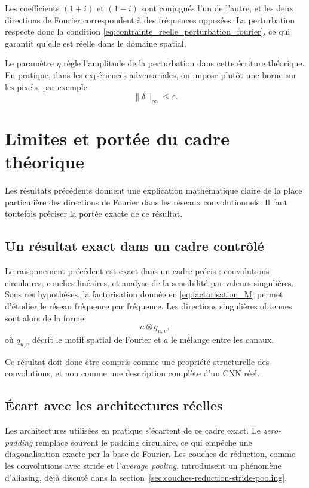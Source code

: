 Les coefficients $(1+i)$ et $(1-i)$ sont conjugués l'un de l'autre, et les deux directions de Fourier
correspondent à des fréquences opposées. La perturbation respecte donc la condition
\eqref{eq:contrainte_reelle_perturbation_fourier}, ce qui garantit qu'elle est réelle dans le domaine spatial.

Le paramètre $\eta$ règle l'amplitude de la perturbation dans cette écriture théorique. En pratique,
dans les expériences adversariales, on impose plutôt une borne sur les pixels, par exemple
\[
    \|\delta\|_\infty \leq \varepsilon.
\]

\section{Limites et portée du cadre théorique}

Les résultats précédents donnent une explication mathématique claire de la place particulière
des directions de Fourier dans les réseaux convolutionnels. Il faut toutefois préciser la portée
exacte de ce résultat.

\subsection{Un résultat exact dans un cadre contrôlé}

Le raisonnement précédent est exact dans un cadre précis : convolutions circulaires, couches
linéaires, et analyse de la sensibilité par valeurs singulières. Sous ces hypothèses, la
factorisation donnée en \eqref{eq:factorisation_M} permet d'étudier le réseau fréquence par
fréquence. Les directions singulières obtenues sont alors de la forme
\[
    a \otimes q_{u,v},
\]
où $q_{u,v}$ décrit le motif spatial de Fourier et $a$ le mélange entre les canaux.

Ce résultat doit donc être compris comme une propriété structurelle des convolutions, et non
comme une description complète d'un CNN réel.

\subsection{Écart avec les architectures réelles}

Les architectures utilisées en pratique s'écartent de ce cadre exact. Le \textit{zero-padding}
remplace souvent le padding circulaire, ce qui empêche une diagonalisation exacte par la base
de Fourier. Les couches de réduction, comme les convolutions avec stride et l'\textit{average
pooling}, introduisent un phénomène d'aliasing, déjà discuté dans la
section~\ref{sec:couches-reduction-stride-pooling}.


